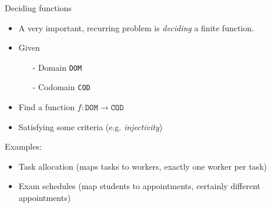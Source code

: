 \begin{frame}{Deciding functions}
\begin{itemize}
\item A very important, recurring problem is \emph{deciding} a finite \alert{function}.
\item Given 
\begin{itemize}
\item[-] Domain \texttt{DOM}
\item[-] Codomain \texttt{COD}
\end{itemize} 
\item Find a function $f : \mathtt{DOM} \to \mathtt{COD}$ 
\item Satisfying some criteria (e.g. \emph{injectivity})
\end{itemize}
\vspace*{1ex}
\pause 
Examples:
\begin{itemize}
\item Task allocation (maps tasks to workers, exactly one worker per task)
\item Exam schedules (map students to appointments, certainly different appointments)
\end{itemize}
\end{frame}

